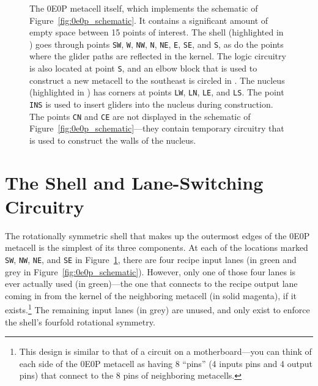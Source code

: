 \begin{figure}[!phtb]
	\centering
		\caption{The 0E0P metacell itself, which implements the schematic of Figure~\ref{fig:0e0p_schematic}. It contains a significant amount of empty space between 15 points of interest. The shell (highlighted in ) goes through points \texttt{SW}, \texttt{W}, \texttt{NW}, \texttt{N}, \texttt{NE}, \texttt{E}, \texttt{SE}, and \texttt{S}, as do the points where the glider paths are reflected in the kernel. The logic circuitry is also located at point \texttt{S}, and an elbow block that is used to construct a new metacell to the southeast is circled in . The nucleus (highlighted in ) has corners at points \texttt{LW}, \texttt{LN}, \texttt{LE}, and \texttt{LS}. The point \texttt{INS} is used to insert gliders into the nucleus during construction. The points \texttt{CN} and \texttt{CE} are not displayed in the schematic of Figure~\ref{fig:0e0p_schematic}---they contain temporary circuitry that is used to construct the walls of the nucleus.}\label{fig:0e0p_itself}
\end{figure}


\section{The Shell and Lane-Switching Circuitry}\label{sec:0e0p_structure_shell}

The rotationally symmetric shell that makes up the outermost edges of the 0E0P metacell is the simplest of its three components. At each of the locations marked \texttt{SW}, \texttt{NW}, \texttt{NE}, and \texttt{SE} in Figure~\ref{fig:0e0p_itself}, there are four recipe input lanes (in green and grey in Figure~\ref{fig:0e0p_schematic}). However, only one of those four lanes is ever actually used (in green)---the one that connects to the recipe output lane coming in from the kernel of the neighboring metacell (in solid magenta), if it exists.\footnote{This design is similar to that of a circuit on a motherboard---you can think of each side of the 0E0P metacell as having 8 ``pins'' (4 inputs pins and 4 output pins) that connect to the 8 pins of neighboring metacells.} The remaining input lanes (in grey) are unused, and only exist to enforce the shell's fourfold rotational symmetry.

